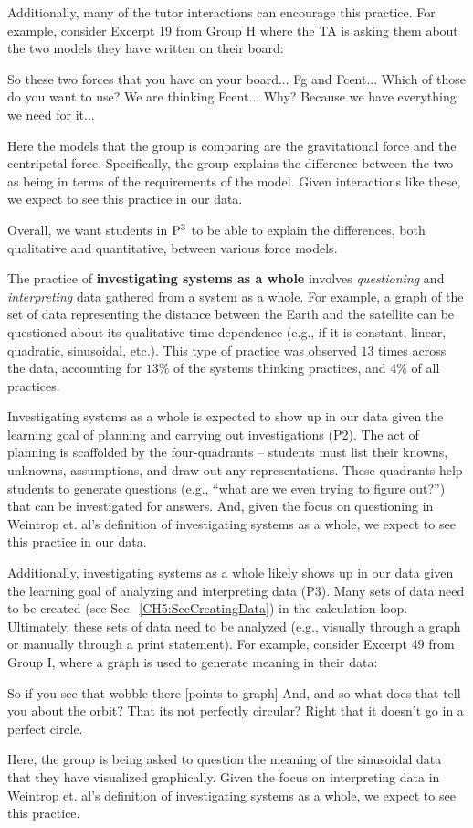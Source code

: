 \documentclass{msuphddissertation}
\begin{document}
\begin{doublespace}
Additionally, many of the tutor interactions can encourage this practice.  For example, consider Excerpt 19 from Group H where the TA is asking them about the two models they have written on their board:\begin{description}
\TA So these two forces that you have on your board...
\TA Fg and Fcent...
\TA Which of those do you want to use?
\SB We are thinking Fcent...
\TA Why?
\SB Because we have everything we need for it...
\end{description}  Here the models that the group is comparing are the gravitational force and the centripetal force.  Specifically, the group explains the difference between the two as being in terms of the requirements of the model.  Given interactions like these, we expect to see this practice in our data.

Overall, we want students in ${\rm P}^{3}$ to be able to explain the differences, both qualitative and quantitative, between various force models.

The practice of \textbf{investigating systems as a whole} involves \textit{questioning} and \textit{interpreting} data gathered from a system as a whole.  For example, a graph of the set of data representing the distance between the Earth and the satellite can be questioned about its qualitative time-dependence (e.g., if it is constant, linear, quadratic, sinusoidal, etc.).  This type of practice was observed $13$ times across the data, accounting for $13\%$ of the systems thinking practices, and $4\%$ of all practices.

Investigating systems as a whole is expected to show up in our data given the learning goal of planning and carrying out investigations (P2).  The act of planning is scaffolded by the four-quadrants -- students must list their knowns, unknowns, assumptions, and draw out any representations.  These quadrants help students to generate questions (e.g., ``what are we even trying to figure out?'') that can be investigated for answers.  And, given the focus on questioning in Weintrop et. al's definition of investigating systems as a whole, we expect to see this practice in our data.

Additionally, investigating systems as a whole likely shows up in our data given the learning goal of analyzing and interpreting data (P3).  Many sets of data need to be created (see Sec.~\ref{CH5:SecCreatingData}) in the calculation loop.  Ultimately, these sets of data need to be analyzed (e.g., visually through a graph or manually through a print statement).  For example, consider Excerpt 49 from Group I, where a graph is used to generate meaning in their data:  \begin{description}
\TA So if you see that wobble there [points to graph]
\TA And, and so what does that tell you about the orbit?
\SB That its not perfectly circular?
\SC Right that it doesn't go in a perfect circle.
\end{description}  Here, the group is being asked to question the meaning of the sinusoidal data that they have visualized graphically.  Given the focus on interpreting data in Weintrop et. al's definition of investigating systems as a whole, we expect to see this practice.


\end{doublespace}
\end{document}

